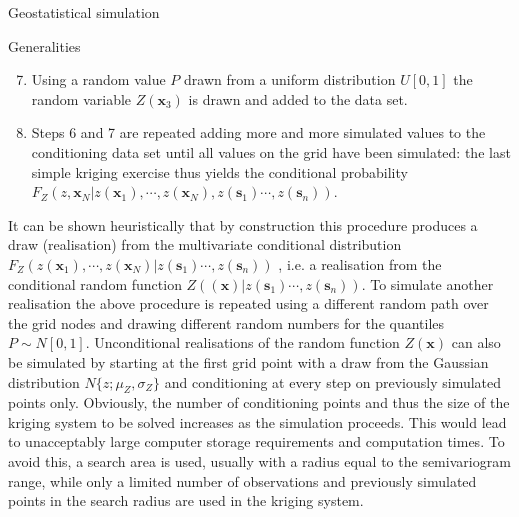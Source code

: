 \documentclass[8pt]{beamer}
\renewcommand{\emph}[1]{\textcolor{myorange}{#1}}
\begin{document}
   \begin{frame}{Geostatistical simulation}
     \begin{block}{Generalities}
    \end{block}
\begin{enumerate}
    \setcounter{enumi}{6} %
    \item Using a random value $P$ drawn from a \emph{uniform distribution} $U[0,1]$ the \emph{random variable} $Z(\mathbf{x}_3)$ is drawn and added to the data set.
    \item Steps 6 and 7 are repeated adding more and more simulated values to the conditioning data set until all values on the grid have been simulated: the last \emph{simple kriging} exercise thus yields the \emph{conditional probability} $F_Z(z,\mathbf{x}_N | z(\mathbf{x}_1),\cdots, z(\mathbf{x}_N),z(\mathbf{s}_1) \cdots, z(\mathbf{s}_n)) $.
\end{enumerate}
It can be shown heuristically that by construction this procedure produces a draw (\emph{realisation}) from the \emph{multivariate conditional distribution} $F_Z( z(\mathbf{x}_1),\cdots, z(\mathbf{x}_N) | z(\mathbf{s}_1) \cdots, z(\mathbf{s}_n)) $ , i.e. a \emph{realisation} from the \emph{conditional random function} $Z( (\mathbf{x}) | z(\mathbf{s}_1) \cdots, z(\mathbf{s}_n)) $. To simulate another realisation the above procedure is repeated using a different random path over the grid nodes and drawing different random numbers for the quantiles $P \sim N[0,1]$. \emph{Unconditional realisations} of the \emph{random function} $Z(\mathbf{x})$ can also be simulated by starting at the first grid point with a \emph{draw} from the \emph{Gaussian distribution} $N\{z;\mu_Z, \sigma_Z\}$ and conditioning at every step on previously simulated points only. Obviously, the number of \emph{conditioning points} and thus the size of the \emph{kriging system} to be solved increases as the simulation proceeds. This would lead to unacceptably large computer storage requirements and computation times. To avoid this, a \emph{search area} is used, usually with a \emph{radius equal} to the \emph{semivariogram range}, while only a limited number of observations and previously simulated points in the search radius are used in the \emph{kriging system}. 
\end{frame}
\end{document}
